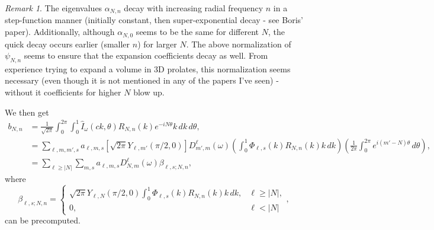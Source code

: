 \documentclass{amsart}
\theoremstyle{definition}
\theoremstyle{remark}
\newtheorem{remark}[theorem]{Remark}
\numberwithin{equation}{section}
\begin{document}
\begin{remark}
The eigenvalues $\alpha_{N,n}$ decay with increasing radial frequency $n$ in a step-function manner (initially constant, then super-exponential decay - see Boris' paper). Additionally, although $\alpha_{N,0}$ seems to be the same for different $N$, the quick decay occurs earlier (smaller $n$) for larger $N$. The above normalization of $\psi_{N,n}$ seems to ensure that the expansion coefficients decay as well. From experience trying to expand a volume in 3D prolates, this normalization seems necessary (even though it is not mentioned in any of the papers I've seen) - without it coefficients for higher $N$ blow up. 
\end{remark}

We then get
\[\begin{aligned} b_{N,n} &= \frac{1}{\sqrt{2\pi}}\int_0^{2\pi}\int_0^1\widehat I_{\omega}(ck,\theta)R_{N,n}(k)e^{-iN\theta}k\, dk\, d\theta,\\
&= \sum_{\ell,m,m',s}a_{\ell,m,s}[\sqrt{2\pi}Y_{\ell,m'}(\pi/2,0)]D_{m',m}^{\ell}(\omega)\left(\int_0^1\Phi_{\ell,s}(k)R_{N,n}(k)k\, dk\right)\left(\frac{1}{2\pi}\int_0^{2\pi}e^{i(m'-N)\theta}\, d\theta\right),\\
&= \sum_{\ell\geq |N|}\sum_{m,s}a_{\ell,m,s}D_{N,m}^{\ell}(\omega)\beta_{\ell,s;N,n},\end{aligned}\]
where
\[ \beta_{\ell,s;N,n} = \left\{\begin{array}{ll} \sqrt{2\pi}Y_{\ell,N}(\pi/2,0)\int_0^1\Phi_{\ell,s}(k)R_{N,n}(k)k\, dk, & \ell\geq |N|,\\ 0, & \ell<|N|\end{array}\right.,\]
can be precomputed.
\end{document}
